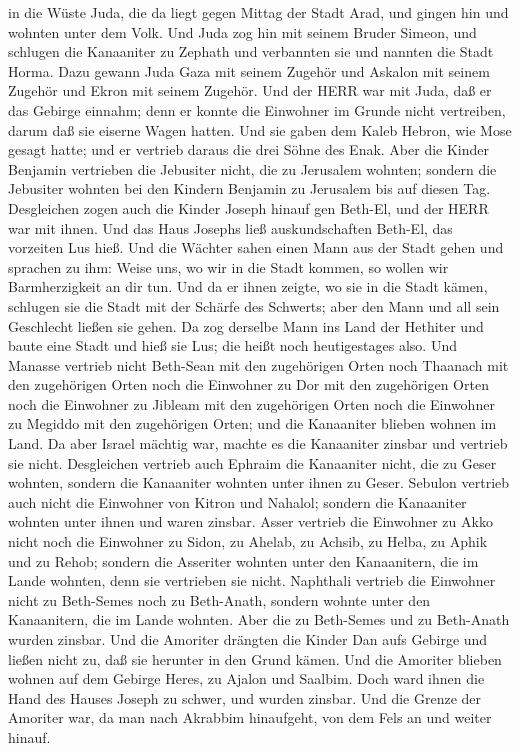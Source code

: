 in die Wüste Juda, die da liegt gegen Mittag der Stadt Arad, und gingen
hin und wohnten unter dem Volk.  Und Juda zog hin mit
seinem Bruder Simeon, und schlugen die Kanaaniter zu Zephath und
verbannten sie und nannten die Stadt Horma.  Dazu gewann
Juda Gaza mit seinem Zugehör und Askalon mit seinem Zugehör und Ekron
mit seinem Zugehör.  Und der HERR war mit Juda, daß er das
Gebirge einnahm; denn er konnte die Einwohner im Grunde nicht
vertreiben, darum daß sie eiserne Wagen hatten.  Und sie
gaben dem Kaleb Hebron, wie Mose gesagt hatte; und er vertrieb daraus
die drei Söhne des Enak.  Aber die Kinder Benjamin
vertrieben die Jebusiter nicht, die zu Jerusalem wohnten; sondern die
Jebusiter wohnten bei den Kindern Benjamin zu Jerusalem bis auf diesen
Tag.  Desgleichen zogen auch die Kinder Joseph hinauf gen
Beth-El, und der HERR war mit ihnen.  Und das Haus Josephs
ließ auskundschaften Beth-El, das vorzeiten Lus hieß.  Und
die Wächter sahen einen Mann aus der Stadt gehen und sprachen zu ihm:
Weise uns, wo wir in die Stadt kommen, so wollen wir Barmherzigkeit an
dir tun.  Und da er ihnen zeigte, wo sie in die Stadt
kämen, schlugen sie die Stadt mit der Schärfe des Schwerts; aber den
Mann und all sein Geschlecht ließen sie gehen.  Da zog
derselbe Mann ins Land der Hethiter und baute eine Stadt und hieß sie
Lus; die heißt noch heutigestages also.  Und Manasse
vertrieb nicht Beth-Sean mit den zugehörigen Orten noch Thaanach mit den
zugehörigen Orten noch die Einwohner zu Dor mit den zugehörigen Orten
noch die Einwohner zu Jibleam mit den zugehörigen Orten noch die
Einwohner zu Megiddo mit den zugehörigen Orten; und die Kanaaniter
blieben wohnen im Land.  Da aber Israel mächtig war, machte
es die Kanaaniter zinsbar und vertrieb sie nicht. 
Desgleichen vertrieb auch Ephraim die Kanaaniter nicht, die zu Geser
wohnten, sondern die Kanaaniter wohnten unter ihnen zu Geser.
 Sebulon vertrieb auch nicht die Einwohner von Kitron und
Nahalol; sondern die Kanaaniter wohnten unter ihnen und waren zinsbar.
 Asser vertrieb die Einwohner zu Akko nicht noch die
Einwohner zu Sidon, zu Ahelab, zu Achsib, zu Helba, zu Aphik und zu
Rehob;  sondern die Asseriter wohnten unter den
Kanaanitern, die im Lande wohnten, denn sie vertrieben sie nicht.
 Naphthali vertrieb die Einwohner nicht zu Beth-Semes noch
zu Beth-Anath, sondern wohnte unter den Kanaanitern, die im Lande
wohnten. Aber die zu Beth-Semes und zu Beth-Anath wurden zinsbar.
 Und die Amoriter drängten die Kinder Dan aufs Gebirge und
ließen nicht zu, daß sie herunter in den Grund kämen.  Und
die Amoriter blieben wohnen auf dem Gebirge Heres, zu Ajalon und
Saalbim. Doch ward ihnen die Hand des Hauses Joseph zu schwer, und
wurden zinsbar.  Und die Grenze der Amoriter war, da man
nach Akrabbim hinaufgeht, von dem Fels an und weiter hinauf.

